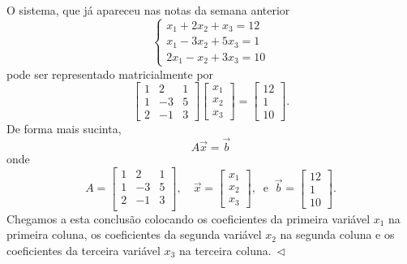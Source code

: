 \documentclass[../livro.tex]{subfiles}  %
\begin{document}
\begin{example}\label{example1}
O sistema, que já apareceu nas notas da semana anterior
\[
\left\{
  \begin{array}{ll}
    x_1 + 2x_2 + x_3 = 12 \\
    x_1 -3x_2 + 5x_3 = 1 \\
    2x_1 - x_2 + 3x_3 = 10
  \end{array}
\right.
\] pode ser representado matricialmente por
\[
\left[
  \begin{array}{ccc}
    1 &  2 & 1  \\
    1 & -3 & 5  \\
    2 & -1 & 3
  \end{array}
\right]
\left[
  \begin{array}{c}
    x_1   \\
    x_2  \\
    x_3
  \end{array}
\right] =
\left[
  \begin{array}{c}
    12   \\
    1  \\
    10
  \end{array}
\right].
\] De forma mais sucinta,
\[
\boxed{A \vec{x} = \vec{b}}
\] onde
\[
A = \left[
  \begin{array}{ccc}
    1 &  2 & 1  \\
    1 & -3 & 5  \\
    2 & -1 & 3  \\
  \end{array}
\right], \quad
\vec{x} = \left[
  \begin{array}{c}
    x_1   \\
    x_2  \\
    x_3
  \end{array}
\right], \ \text{ e } \
\vec{b} = \left[
  \begin{array}{c}
    12   \\
    1  \\
    10
  \end{array}
\right].
\] Chegamos a esta conclusão colocando os coeficientes da primeira variável $x_1$ na primeira coluna, os coeficientes da segunda variável $x_2$ na segunda coluna e os coeficientes da terceira variável $x_3$ na terceira coluna$. \ \lhd$
\end{example}
\end{document}
